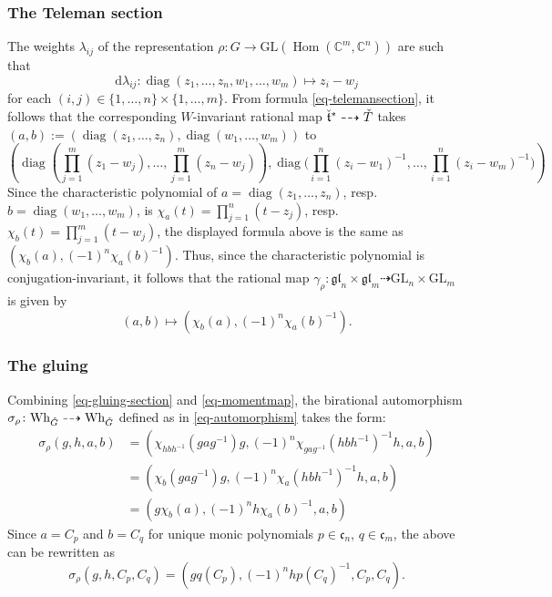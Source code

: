 \documentclass[11pt]{article}
\theoremstyle{definition}
\theoremstyle{plain}
\theoremstyle{remark}
\newcommand{\GL}{\mathrm{GL}}
\newcommand{\numberset}{\mathbb}
\newcommand{\C}{\numberset{C}}
\newcommand{\gl}{\mathfrak{gl}}
\DeclareMathOperator{\Hom}{Hom}
\DeclareMathOperator{\diag}{diag}
\begin{document}
        \subsubsection{The Teleman section}
    
        The weights $\lambda_{ij}$ of the representation $\rho\colon G \to \GL(\Hom(\C^m,\C^n))$ are such that
        \[
            \mathrm{d}\lambda_{ij}\colon \diag(z_1,\dots,z_n,w_1,\dots,w_m) \mapsto z_i-w_j
        \]
        for each $(i,j) \in \{1,\dots,n\} \times \{1,\dots,m\}$. From formula \eqref{eq-telemansection}, it follows that the corresponding $W$-invariant rational map $\Check{\mathfrak{t}}^* \dashrightarrow \Check{T}$ takes $(a,b) := (\diag(z_1,\dots,z_n),\diag(w_1,\dots,w_m))$ to
        \[
            \textstyle{ \left( \diag\left(\prod_{j=1}^m(z_1-w_j),\dots,\prod_{j=1}^m(z_n-w_j)\right), \diag \Big(\prod_{i=1}^n(z_i-w_1)^{-1},\dots,\prod_{i=1}^n(z_i-w_m)^{-1} \Big)\right)}
        \]
        Since the characteristic polynomial of $a = \diag(z_1,\dots,z_n)$, resp.\ $b = \diag(w_1,\dots,w_m)$, is $\chi_a(t) = \prod_{j=1}^n(t-z_j)$, resp.\ $\chi_b(t) = \prod_{j=1}^m(t-w_j)$, the displayed formula above is the same as $(\chi_b(a),(-1)^n\chi_a(b)^{-1})$. Thus, since the characteristic polynomial is conjugation-invariant, it follows that the rational map $\gamma_\rho \colon \gl_n \times \gl_m \dashrightarrow \GL_n \times \GL_m$ is given by
        \begin{equation}\label{eq-gluing-section}
            (a,b) \mapsto (\chi_{b}(a),(-1)^n\chi_{a}(b)^{-1}).
        \end{equation}
        

        \subsubsection{The gluing}

        Combining \eqref{eq-gluing-section} and \eqref{eq-momentmap}, the birational automorphism $\sigma_{\rho}\colon \mathrm{Wh}_{\Check{G}} \dashrightarrow \mathrm{Wh}_{\Check{G}}$ defined as in \eqref{eq-automorphism} takes the form:
        \begin{align}
            \sigma_{\rho}(g,h,a,b) &= (\chi_{hbh^{-1}}(gag^{-1})g, (-1)^n\chi_{gag^{-1}}(hbh^{-1})^{-1} h,a,b) \nonumber \\
            &= (\chi_b(gag^{-1})g, (-1)^n\chi_a(hbh^{-1})^{-1}h, a, b) \nonumber \\
            &= (g\chi_b(a),(-1)^nh\chi_a(b)^{-1},a,b) \nonumber
        \end{align}
        Since $a = C_p$ and $b = C_q$ for unique monic polynomials $p \in \mathfrak{c}_n$, $q \in \mathfrak{c}_m$, the above can be rewritten as
        \begin{equation}\label{eq-formula-sigma}
            \sigma_{\rho}(g,h,C_p,C_q) = (gq(C_p), (-1)^nhp(C_q)^{-1}, C_p, C_q).
        \end{equation}
\end{document}
